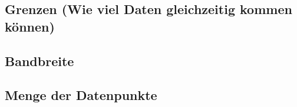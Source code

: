 \subsection{Grenzen (Wie viel Daten gleichzeitig kommen können)}
\subsection{Bandbreite}
\subsection{Menge der Datenpunkte}